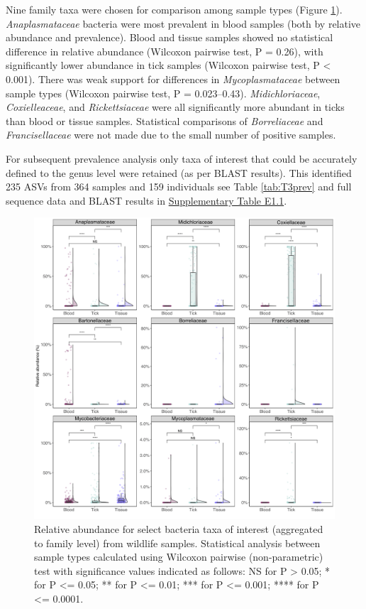 \documentclass[a4paper, nobind]{templates/ociamthesis}
\begin{document}
Nine family taxa were chosen for comparison among sample types (Figure \ref{fig:F3tois}). \emph{Anaplasmataceae} bacteria were most prevalent in blood samples (both by relative abundance and prevalence). Blood and tissue samples showed no statistical difference in relative abundance (Wilcoxon pairwise test, P = 0.26), with significantly lower abundance in tick samples (Wilcoxon pairwise test, P \textless{} 0.001).
There was weak support for differences in \emph{Mycoplasmataceae} between sample types (Wilcoxon pairwise test, P = 0.023--0.43).
\emph{Midichloriaceae}, \emph{Coxielleaceae}, and \emph{Rickettsiaceae} were all significantly more abundant in ticks than blood or tissue samples.
Statistical comparisons of \emph{Borreliaceae} and \emph{Francisellaceae} were not made due to the small number of positive samples.

For subsequent prevalence analysis only taxa of interest that could be accurately defined to the genus level were retained (as per BLAST results). This identified 235 ASVs from 364 samples and 159 individuals see Table \ref{tab:T3prev} and full sequence data and BLAST results in \protect\hyperlink{supplementary-table-e1.1}{Supplementary Table E1.1}.

\begin{figure}
\includegraphics[width=0.95\linewidth]{figures/ms-figs/Ch3-toiboxplot} \caption[Relative abundance for select bacteria taxa from wildlife samples.]{Relative abundance for select bacteria taxa of interest (aggregated to family level) from wildlife samples. Statistical analysis between sample types calculated using Wilcoxon pairwise (non-parametric) test with significance values indicated as follows: NS for P > 0.05; * for P <= 0.05; ** for P <= 0.01; *** for P <= 0.001; **** for P <= 0.0001.}\label{fig:F3tois}
\end{figure}
\end{document}

